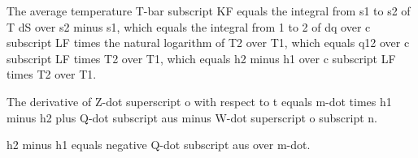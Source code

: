 The average temperature T-bar subscript KF equals the integral from s1 to s2 of T dS over s2 minus s1, which equals the integral from 1 to 2 of dq over c subscript LF times the natural logarithm of T2 over T1, which equals q12 over c subscript LF times T2 over T1, which equals h2 minus h1 over c subscript LF times T2 over T1.

The derivative of Z-dot superscript o with respect to t equals m-dot times h1 minus h2 plus Q-dot subscript aus minus W-dot superscript o subscript n.

h2 minus h1 equals negative Q-dot subscript aus over m-dot.